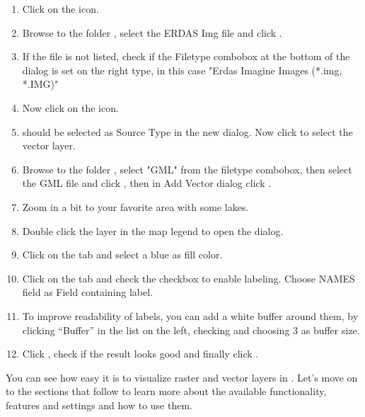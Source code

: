 {\setlength{\baselineskip}{1.3\baselineskip}
\begin{enumerate}[itemsep=2pt]
\item Click on the  icon.
\item Browse to the folder , select 
the ERDAS Img file  and click .
\item If the file is not listed, check if the Filetype combobox at the
bottom of the dialog is set on the right type, in this case "Erdas Imagine
Images (*.img, *.IMG)"
\item Now click on the  icon. 
\item {} should be selected as Source Type in the new
 dialog. Now click  to select the
vector layer.
\item Browse to the folder , select "GML"
from the filetype combobox, then select the GML file  
and click , then in Add Vector dialog click .
\item Zoom in a bit to your favorite area with some lakes.
\item Double click the  layer in the map legend to open the 
 dialog.
\item Click on the  tab and select a blue as fill color.
\item Click on the  tab and check the  
checkbox to enable labeling. Choose NAMES field as Field containing label.
\item To improve readability of labels, you can add a white buffer around them,
by clicking ``Buffer'' in the list on the left, checking  and choosing 3 as buffer size.
\item Click , check if the result looks good and finally
click .
\end{enumerate} 
\par}
You can see how easy it is to visualize raster and vector layers in 
\qg. Let's move on to the sections that follow to learn more about the 
available functionality, features and settings and how to use them.

\FloatBarrier
